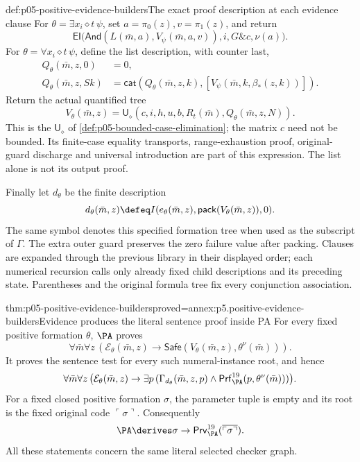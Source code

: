 \begin{hbdefinition}{def:p05-positive-evidence-builders}{The exact proof description at each evidence clause}
For \(\theta=\exists x_i\mathrel\diamond t\,\psi\), set
\(a=\pi_0(z),v=\pi_1(z)\), and return
\[
 \mathsf{EI}\bigl(
   \mathsf{And}(L(\bar m,a),V_\psi(\bar m,a,v)),
                                    i,G\mathbin{\&}c,\nu(a)\bigr).
\]
For \(\theta=\forall x_i\mathrel\diamond t\,\psi\), define the
list description, with counter last,
\[
\begin{aligned}
 Q_\theta(\bar m,z,0)&=0,\\
 Q_\theta(\bar m,z,Sk)&=
    \mathsf{cat}(Q_\theta(\bar m,z,k),
                  [V_\psi(\bar m,k,\beta_*(z,k))]).
\end{aligned}
\]
Return the actual quantified tree
\[
 V_\theta(\bar m,z)=
       \mathsf U_\diamond
          (c,i,h,u,b,R_t(\bar m),Q_\theta(\bar m,z,N)).
\]
This is the \(\mathsf U_\diamond\) of
\cref{def:p05-bounded-case-elimination}; the matrix \(c\) need not
be bounded. Its finite-case equality transports, range-exhaustion proof,
original-guard discharge and universal introduction are part of this
expression. The list alone is not its output proof.

Finally let \(d_\theta\) be the finite description
\[
 d_\theta(\bar m,z)\defeq
  I(e_\theta(\bar m,z),\mathsf{pack}(V_\theta(\bar m,z)),0).
\]
The same symbol denotes this specified formation tree when used as the
subscript of \(\Gamma\). The extra outer guard preserves the zero
failure value after packing. Clauses are expanded through the previous
library in their displayed order; each numerical recursion calls only
already fixed child descriptions and its preceding state. Parentheses
and the original formula tree fix every conjunction association.
\end{hbdefinition}

\begin{hbtheorem}{thm:p05-positive-evidence-builders}{proved=annex:p5.positive-evidence-builders}{Evidence produces the literal sentence proof inside PA}
For every fixed positive formation \(\theta\), \(\PA\) proves
\[
 \forall\bar m\forall z\,
  (\mathcal E_\theta(\bar m,z)\to
           \mathsf{Safe}(V_\theta(\bar m,z),\theta^\nu(\bar m))).
\]
It proves the sentence test for every such numeral-instance root, and hence
\[
 \forall\bar m\forall z\,
 \bigl(\mathcal E_\theta(\bar m,z)\to
   \exists p\,(\Gamma_{d_\theta}(\bar m,z,p)\land
                   \mathsf{Prf}^{19}_{\PA}(p,\theta^\nu(\bar m)))\bigr).
\]
For a fixed closed positive formation \(\sigma\), the parameter tuple
is empty and its root is the fixed original code \(\ulcorner\sigma\urcorner\).
Consequently
\[
 \PA\derives\sigma\to
             \mathsf{Prv}^{19}_{\PA}
                         (\overline{\ulcorner\sigma\urcorner}).
\]
All these statements concern the same literal selected checker graph.
\end{hbtheorem}

